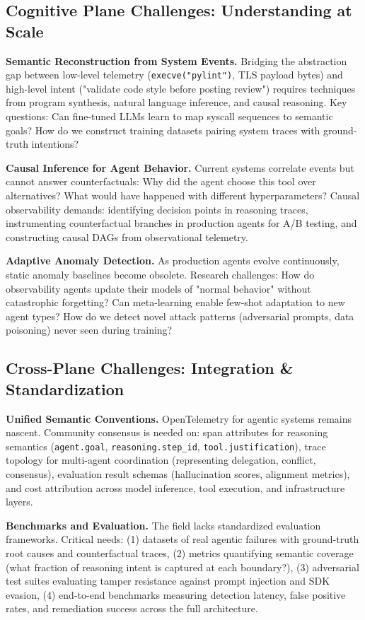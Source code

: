 \documentclass[sigplan,screen,9pt]{acmart}
\begin{document}
\subsection{Cognitive Plane Challenges: Understanding at Scale}

\textbf{Semantic Reconstruction from System Events.} Bridging the abstraction gap between low-level telemetry (\texttt{execve("pylint")}, TLS payload bytes) and high-level intent ("validate code style before posting review") requires techniques from program synthesis, natural language inference, and causal reasoning. Key questions: Can fine-tuned LLMs learn to map syscall sequences to semantic goals? How do we construct training datasets pairing system traces with ground-truth intentions?

\textbf{Causal Inference for Agent Behavior.} Current systems correlate events but cannot answer counterfactuals: Why did the agent choose this tool over alternatives? What would have happened with different hyperparameters? Causal observability demands: identifying decision points in reasoning traces, instrumenting counterfactual branches in production agents for A/B testing, and constructing causal DAGs from observational telemetry.

\textbf{Adaptive Anomaly Detection.} As production agents evolve continuously, static anomaly baselines become obsolete. Research challenges: How do observability agents update their models of "normal behavior" without catastrophic forgetting? Can meta-learning enable few-shot adaptation to new agent types? How do we detect novel attack patterns (adversarial prompts, data poisoning) never seen during training?

\subsection{Cross-Plane Challenges: Integration \& Standardization}

\textbf{Unified Semantic Conventions.} OpenTelemetry for agentic systems remains nascent. Community consensus is needed on: span attributes for reasoning semantics (\texttt{agent.goal}, \texttt{reasoning.step\_id}, \texttt{tool.justification}), trace topology for multi-agent coordination (representing delegation, conflict, consensus), evaluation result schemas (hallucination scores, alignment metrics), and cost attribution across model inference, tool execution, and infrastructure layers.

\textbf{Benchmarks and Evaluation.} The field lacks standardized evaluation frameworks. Critical needs: (1) datasets of real agentic failures with ground-truth root causes and counterfactual traces, (2) metrics quantifying semantic coverage (what fraction of reasoning intent is captured at each boundary?), (3) adversarial test suites evaluating tamper resistance against prompt injection and SDK evasion, (4) end-to-end benchmarks measuring detection latency, false positive rates, and remediation success across the full architecture.
\end{document}

